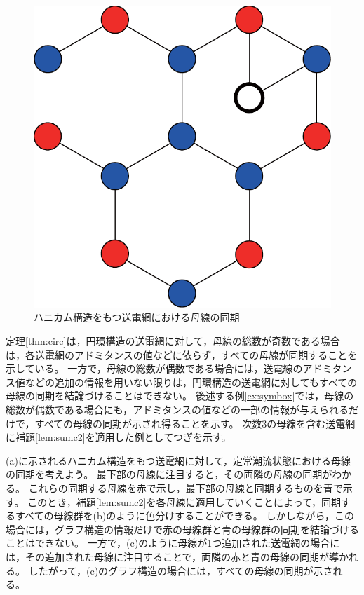 \documentclass[tombow,dvipdfmx]{corona-a5-1.1}
\begin{document}
\begin{figure}[t]
{\begin{minipage}{0.3\linewidth}
    \centering
    \includegraphics[width = .70\linewidth]{figs/honyc}
    \subcaption{  }
  \end{minipage}
  \medskip
  \caption{ハニカム構造をもつ送電網における母線の同期}
  \label{fig:hony}
  }
\medskip
\end{figure}
定理\ref{thm:circ}は，円環構造の送電網に対して，母線の総数が奇数である場合は，各送電網のアドミタンスの値などに依らず，すべての母線が同期することを示している。
一方で，母線の総数が偶数である場合には，送電線のアドミタンス値などの追加の情報を用いない限りは，円環構造の送電網に対してもすべての母線の同期を結論づけることはできない。
後述する例\ref{ex:symbox}では，母線の総数が偶数である場合にも，アドミタンスの値などの一部の情報が与えられるだけで，すべての母線の同期が示され得ることを示す。
次数3の母線を含む送電網に補題\ref{lem:sumc2}を適用した例としてつぎを示す。

\begin{例}[ハニカム構造の送電網における母線の同期]\label{ex:deg3}
(a)に示されるハニカム構造をもつ送電網に対して，定常潮流状態における母線の同期を考えよう。
最下部の母線に注目すると，その両隣の母線の同期がわかる。
これらの同期する母線を赤で示し，最下部の母線と同期するものを青で示す。
このとき，補題\ref{lem:sumc2}を各母線に適用していくことによって，同期するすべての母線群を(b)のように色分けすることができる。
しかしながら，この場合には，グラフ構造の情報だけで赤の母線群と青の母線群の同期を結論づけることはできない。
一方で，(c)のように母線が1つ追加された送電網の場合には，その追加された母線に注目することで，両隣の赤と青の母線の同期が導かれる。
したがって，(c)のグラフ構造の場合には，すべての母線の同期が示される。
\end{例}
\end{document}
